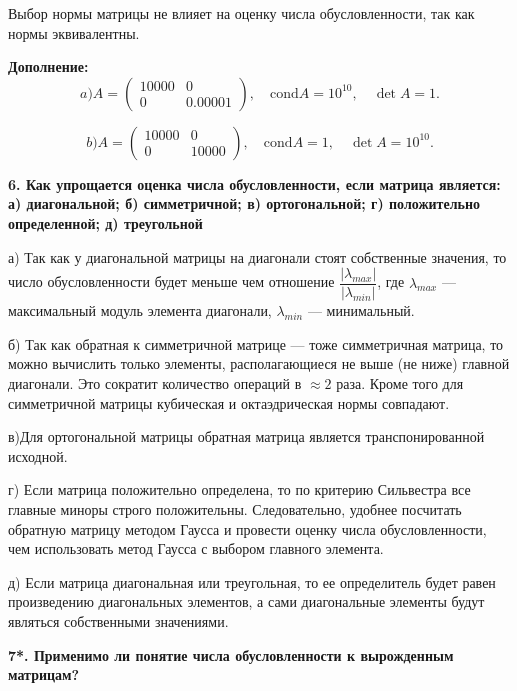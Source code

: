 \documentclass[12pt, a4paper]{article}
\begin{document}
	Выбор нормы матрицы не влияет на оценку числа обусловленности, так как нормы эквивалентны.
	
	\textbf{Дополнение:} 
		\[ a)
	A=
	\begin{pmatrix}
		10000 & 0\\
		0 & 0.00001
	\end{pmatrix},
	\quad
		\mathrm{cond} A=10^{10},
	\quad
		\det{A}=1.
	\]
	
		\[ b)
	A=
	\begin{pmatrix}
		10000 & 0\\
		0 & 10000
	\end{pmatrix},
	\quad
	\mathrm{cond} A=1,
	\quad
	\det{A}=10^{10}.
	\]
	
	\textbf{6. Как упрощается оценка числа обусловленности, если матрица является: а) диагональной; б) симметричной; в) ортогональной; г) положительно определенной; д) треугольной}
	
	а) Так как у диагональной матрицы на диагонали стоят собственные значения, то число обусловленности будет меньше чем отношение $ \dfrac{ | \lambda_{max} |}{ | \lambda_{min} |}$, где $\lambda_{max}$ --- максимальный модуль элемента диагонали, $\lambda_{min}$ --- минимальный.
	
	б) Так как обратная к симметричной матрице --- тоже симметричная матрица, то можно вычислить только элементы, располагающиеся не выше (не ниже) главной диагонали. Это сократит количество операций в $\approx 2$ раза. Кроме того для симметричной матрицы кубическая и октаэдрическая нормы совпадают.
	
	в)Для ортогональной матрицы обратная матрица является транспонированной исходной.
	
	г) Если матрица положительно определена, то по критерию Сильвестра все главные миноры строго положительны. Следовательно, удобнее посчитать обратную матрицу методом Гаусса и провести оценку числа обусловленности, чем использовать метод Гаусса с выбором главного элемента. 
	
	д) Если матрица диагональная или треугольная, то ее определитель будет равен произведению диагональных элементов, а сами диагональные элементы будут являться собственными значениями.
	
	\textbf{7*. Применимо ли понятие числа обусловленности к вырожденным матрицам? }
	
\end{document}
